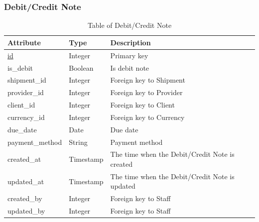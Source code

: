 \subsubsection{Debit/Credit Note}
\begin{table}[H]
    \centering
    \begin{tabular}{|p{3cm}|p{2cm}|p{\dimexpr\textwidth-6.8cm}|} %
        \hline
        \rowcolor[HTML]{C0C0C0} 
        \textbf{Attribute} & \textbf{Type} & \textbf{Description} \\ \hline
        \underline{id} & Integer & Primary key \\ \hline
        is\_debit & Boolean & Is debit note \\ \hline
        shipment\_id & Integer & Foreign key to Shipment \\ \hline
        provider\_id & Integer & Foreign key to Provider \\ \hline
        client\_id & Integer & Foreign key to Client \\ \hline
        currency\_id & Integer & Foreign key to Currency \\ \hline
        due\_date & Date & Due date \\ \hline
        payment\_method & String & Payment method \\ \hline
        created\_at & Timestamp & The time when the Debit/Credit Note is created \\ \hline
        updated\_at & Timestamp & The time when the Debit/Credit Note is updated \\ \hline
        created\_by & Integer & Foreign key to Staff \\ \hline
        updated\_by & Integer & Foreign key to Staff \\ \hline
    \end{tabular}
    \caption{Table of Debit/Credit Note}
    \label{tab:debit-credit-note-table}
\end{table}

